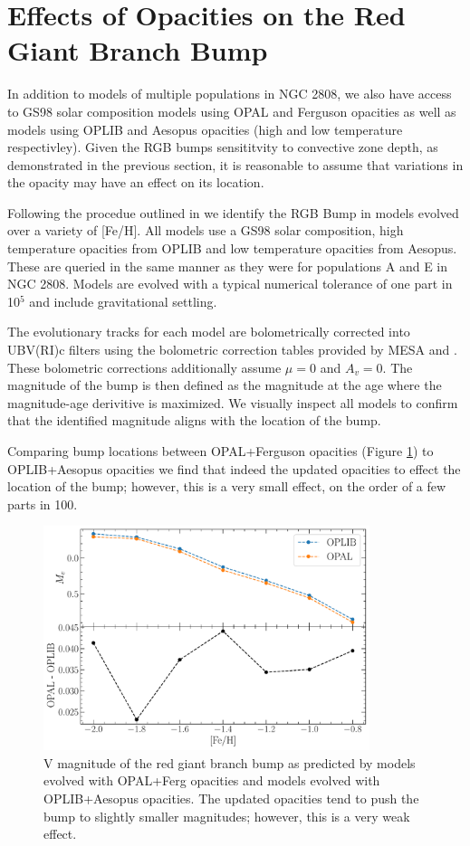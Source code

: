 \section{Effects of Opacities on the Red Giant Branch Bump}
In addition to models of multiple populations in NGC 2808, we also have access
to GS98 solar composition models using OPAL and Ferguson opacities as well as
models using OPLIB and Aesopus opacities (high and low temperature
respectivley). Given the RGB bumps sensititvity to convective zone depth, as
demonstrated in the previous section, it is reasonable to assume that
variations in the opacity may have an effect on its location. 

Following the procedue outlined in \citep{Joyce2015} we identify the RGB Bump
in models evolved over a variety of [Fe/H]. All models use a GS98 solar
composition, high temperature opacities from OPLIB and low temperature
opacities from Aesopus. These are queried in the same manner as they were for
populations A and E in NGC 2808. Models are evolved with a typical numerical
tolerance of one part in 10$^{5}$ and include gravitational settling. 

The evolutionary tracks for each model are bolometrically corrected into
UBV(RI)c filters using the bolometric correction tables provided by MESA
\addcite and \fidanka. These bolometric corrections additionally assume $\mu =
0$ and $A_{v} = 0$. The magnitude of the bump is then defined as the magnitude
at the age where the magnitude-age derivitive is maximized. We visually inspect
all models to confirm that the identified magnitude aligns with the location of
the bump.

Comparing bump locations between OPAL+Ferguson opacities (Figure
\ref{fig:OPALvsOPLIBRGBB}) to OPLIB+Aesopus opacities we find that indeed the
updated opacities to effect the location of the bump; however, this is a very
small effect, on the order of a few parts in 100.

\begin{figure}
  \centering
  \includegraphics[width=0.85\textwidth]{figures/rgbb/OPALvsOPLIBComparison.pdf}
  \caption{V magnitude of the red giant branch bump as predicted by models
  evolved with OPAL+Ferg opacities and models evolved with OPLIB+Aesopus
  opacities. The updated opacities tend to push the bump to slightly smaller
  magnitudes; however, this is a very weak effect.}
  \label{fig:OPALvsOPLIBRGBB}
\end{figure}
